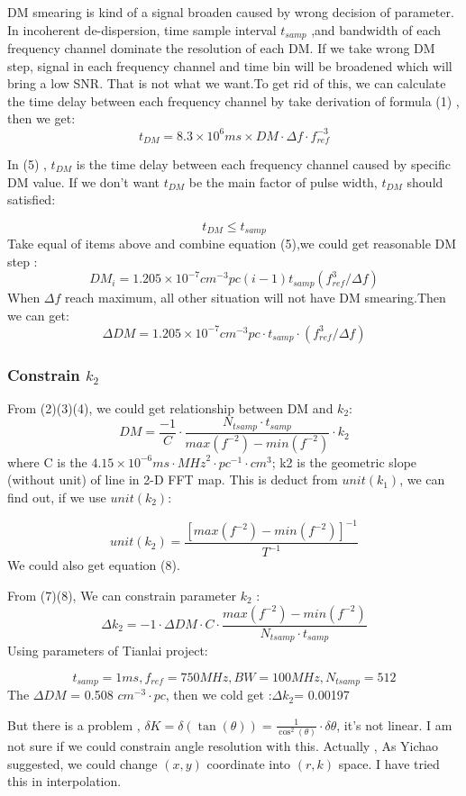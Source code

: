 \documentclass{aastex61}
\begin{document}
DM smearing is kind of a signal broaden caused by wrong decision of parameter. In incoherent de-dispersion, time sample interval $t_{samp}$ ,and bandwidth of each frequency channel dominate the resolution of each DM. If we take wrong DM step, signal in each frequency channel and time bin will be broadened which will bring a low SNR. That is not what we want.To get rid of this, we can calculate the time delay between each frequency channel by take derivation of formula (1) , then we get:
\begin{equation}
t_{DM}=8.3 \times 10^6ms \times DM \cdot \Delta f \cdot f^{-3}_{ref} 
\end{equation}


In (5) , $t_{DM}$ is the time delay between each frequency channel caused by specific DM value. If we don't want  $t_{DM}$ be the main factor of pulse width, $t_{DM}$ should satisfied:

{\centering \[ t_{DM} \leq t_{samp} \]}
Take equal of items above and combine equation (5),we could get  reasonable DM step :
\begin{equation}
DM_i = 1.205 \times 10^{-7} cm^{-3} pc (i-1) t_{samp}(f^3_{ref} / \Delta f)
\end{equation}
When $\Delta f $ reach maximum, all other situation will not have DM smearing.Then we can get:
\begin{equation}
\Delta DM=1.205 \times 10^{-7} cm^{-3} pc\cdot t_{samp}\cdot(f^3_{ref} / \Delta f)
\end{equation}
\subsubsection{Constrain $k_2$}
From (2)(3)(4), we could get relationship between DM and $k_2$:
\begin{equation}
DM = \frac{-1}{C}  \cdot\frac{N_{tsamp}\cdot t_{samp}}{max(f^{-2})-min(f^{-2})}\cdot k_2
\end{equation}
where C is the $4.15 \times 10^{-6} ms \cdot {MHz}^2 \cdot pc^{-1} \cdot cm^3$; k2 is the geometric slope (without unit) of line in 2-D FFT map. This is deduct from $unit(k_1)$, we can find out, if we use $unit(k_2)$:

{\centering \[unit(k_2)=\frac{[max(f^{-2})-min(f^{-2})]^{-1}}{T^{-1}} \]}
We could also get equation (8).
\pagebreak

From (7)(8), We can constrain parameter $k_2$  :
\begin{equation}
\Delta k_2 = -1 \cdot \Delta DM \cdot C \cdot \frac{max(f^{-2})-min(f^{-2})}{N_{tsamp}\cdot t_{samp}}
\end{equation}
Using parameters of Tianlai project:

{\center \[t_{samp} =1 ms, f_{ref}=750 MHz , BW = 100 MHz , N_{tsamp}=512\]}
The $\Delta DM$ = 0.508 $cm^{-3}\cdot pc$, then we cold get :$\Delta k_2$= 0.00197

But there is a problem ,  $\delta K = \delta(\tan(\theta ))=\frac{1}{\cos^2(\theta)} \cdot \delta \theta$, it's not linear. I am not sure if we could constrain angle resolution with this.
Actually , As Yichao suggested, we could change $(x,y)$ coordinate into $(r,k)$  space. I have tried this in interpolation.
\end{document}
